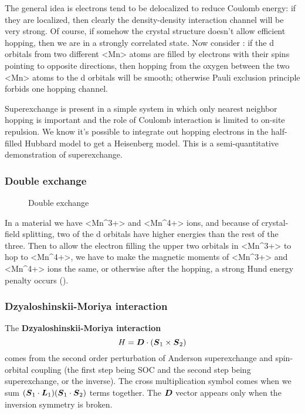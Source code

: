 \documentclass[hyperref, a4paper]{article}
\newcommand*{\concept}[1]{{\textbf{#1}}}
\def\ce#1{<#1>}%
\begin{document}
The general idea is electrons tend to be delocalized to reduce Coulomb energy:
if they are localized, 
then clearly the density-density interaction channel will be very strong.
Of course, if somehow the crystal structure doesn't allow efficient hopping, 
then we are in a strongly correlated state. 
Now consider :
if the d orbitals from two different \ce{Mn} atoms are filled by 
electrons with their spins pointing to opposite directions, 
then hopping from the oxygen between the two \ce{Mn} atoms to the d orbitals
will be smooth; 
otherwise Pauli exclusion principle forbids one hopping channel. 

Superexchange is present in a simple system 
in which only nearest neighbor hopping is important 
and the role of Coulomb interaction 
is limited to on-site repulsion.
We know it's possible to integrate out hopping electrons in the half-filled Hubbard model 
to get a Heisenberg model.
This is a semi-quantitative demonstration of superexchange.

\subsubsection{Double exchange}

\begin{figure}
    \centering
    
    \caption{Double exchange}
    \label{fig:double-exchange}
\end{figure}

In a material we have \ce{Mn^{3+}} and \ce{Mn^{4+}} ions,
and because of crystal-field splitting, 
two of the d orbitals have higher energies than the rest of the three. 
Then to allow the electron filling the upper two orbitals in \ce{Mn^{3+}}
to hop to \ce{Mn^{4+}},
we have to make the magnetic moments of \ce{Mn^{3+}} and \ce{Mn^{4+}} ions the same, 
or otherwise after the hopping, 
a strong Hund energy penalty occurs
(). 

\subsubsection{Dzyaloshinskii-Moriya interaction}\label{sec:localized.itinerant-media.dm}

The \concept{Dzyaloshinskii-Moriya interaction} 
\begin{equation}
    H = \vb*{D} \cdot (\vb*{S}_1 \times \vb*{S}_2)
\end{equation}
comes from 
the second order perturbation 
of Anderson superexchange and spin-orbital coupling
(the first step being SOC and the second step being superexchange,
or the inverse). 
The cross multiplication symbol comes 
when we sum $(\vb*{S}_1 \cdot \vb*{L}_1) (\vb*{S}_1 \cdot \vb*{S}_2)$ terms together.
The $\vb*{D}$ vector appears only when the inversion symmetry is broken. 
\end{document}

